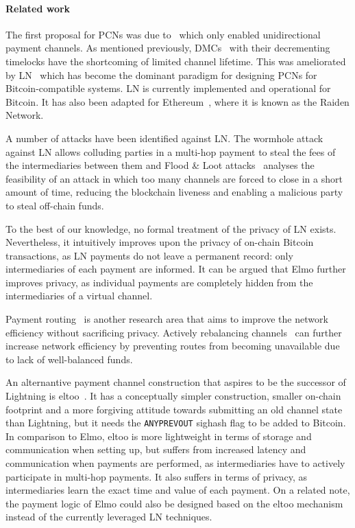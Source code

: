 \paragraph{Related work}
 The first proposal for PCNs was due to~\cite{spilman} which only enabled
 unidirectional payment channels. As mentioned previously, DMCs~\cite{decker}
 with their decrementing timelocks have the shortcoming of limited channel
 lifetime. This was ameliorated by LN~\cite{lightning} which has become the dominant paradigm for designing PCNs for Bitcoin-compatible systems. 
 LN is currently implemented and operational for
  Bitcoin. It has also been adapted for Ethereum~\cite{wood2014ethereum}, where
  it is known as the Raiden Network.

A number of attacks have been identified against LN. The wormhole
  attack~\cite{DBLP:conf/ndss/MalavoltaMSKM19} against LN allows
  colluding parties in a multi-hop payment to steal the fees of the
  intermediaries between them and Flood \& Loot attacks~\cite{10.1145/3419614.3423248}
  analyses the feasibility of an attack in which too many channels are forced to
  close in a short amount of time, reducing the blockchain liveness and enabling
  a malicious party to steal off-chain funds.

  To the best of our knowledge, no formal treatment of the privacy of LN exists.
  Nevertheless, it intuitively improves upon the privacy of on-chain Bitcoin
  transactions, as LN payments do not leave a permanent record: only
  intermediaries of each payment are informed. It can be argued that Elmo
  further improves privacy, as individual payments are completely hidden from
  the intermediaries of a virtual channel.

  Payment routing~\cite{spider,prihodko2016flare,lee2020routee} is another research area that aims to improve the network efficiency without sacrificing  privacy. Actively rebalancing channels~\cite{DBLP:conf/ccs/KhalilG17} can
  further increase network efficiency by preventing routes from becoming   unavailable due to lack of well-balanced funds.

  An alternantive payment channel construction that aspires to be the successor
  of Lightning is eltoo~\cite{eltoo}. It has a conceptually simpler
  construction, smaller on-chain footprint and a more forgiving attitude towards
  submitting an old channel state than Lightning, but it needs the
  \texttt{ANYPREVOUT} sighash flag to be added to Bitcoin. In comparison to
  Elmo, eltoo is more lightweight in terms of storage and communication when
  setting up, but suffers from increased latency and communication when payments
  are performed, as intermediaries have to actively participate in multi-hop
  payments. It also suffers in terms of privacy, as intermediaries learn the
  exact time and value of each payment. On a related note, the payment logic of
  Elmo could also be designed based on the eltoo mechanism instead of the
  currently leveraged LN techniques.

